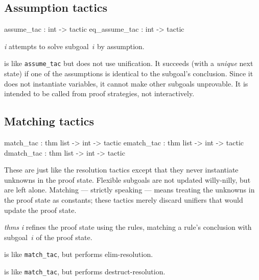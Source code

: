 \subsection{Assumption tactics}
\begin{ttbox} 
assume_tac    : int -> tactic
eq_assume_tac : int -> tactic
\end{ttbox} 
\begin{ttdescription}
\item[\ttindexbold{assume_tac} {\it i}] 
attempts to solve subgoal~$i$ by assumption.

\item[\ttindexbold{eq_assume_tac}] 
is like {\tt assume_tac} but does not use unification.  It succeeds (with a
\emph{unique} next state) if one of the assumptions is identical to the
subgoal's conclusion.  Since it does not instantiate variables, it cannot
make other subgoals unprovable.  It is intended to be called from proof
strategies, not interactively.
\end{ttdescription}

\subsection{Matching tactics} \label{match_tac}
\begin{ttbox} 
match_tac  : thm list -> int -> tactic
ematch_tac : thm list -> int -> tactic
dmatch_tac : thm list -> int -> tactic
\end{ttbox}
These are just like the resolution tactics except that they never
instantiate unknowns in the proof state.  Flexible subgoals are not updated
willy-nilly, but are left alone.  Matching --- strictly speaking --- means
treating the unknowns in the proof state as constants; these tactics merely
discard unifiers that would update the proof state.
\begin{ttdescription}
\item[\ttindexbold{match_tac} {\it thms} {\it i}] 
refines the proof state using the rules, matching a rule's
conclusion with subgoal~$i$ of the proof state.

\item[\ttindexbold{ematch_tac}] 
is like {\tt match_tac}, but performs elim-resolution.

\item[\ttindexbold{dmatch_tac}] 
is like {\tt match_tac}, but performs destruct-resolution.
\end{ttdescription}


